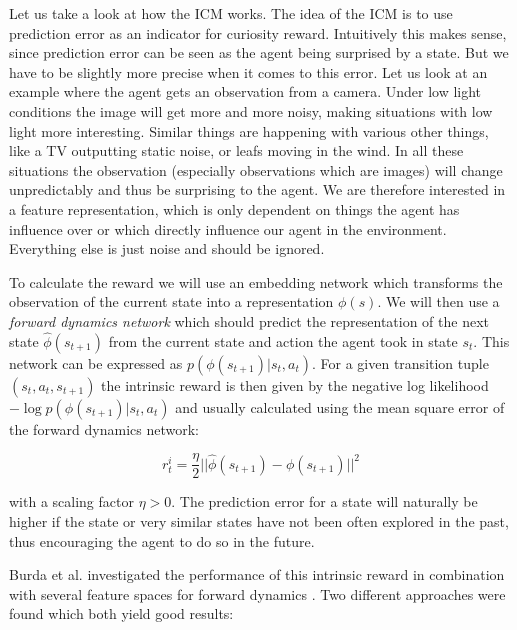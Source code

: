 Let us take a look at how the ICM works. The idea of the ICM is to use prediction error as an indicator for curiosity reward. Intuitively this makes sense, since prediction error can be seen as the agent being surprised by a state. But we have to be slightly more precise when it comes to this error. Let us look at an example where the agent gets an observation from a camera. Under low light conditions the image will get more and more noisy, making situations with low light more interesting. Similar things are happening with various other things, like a TV outputting static noise, or leafs moving in the wind. In all these situations the observation (especially observations which are images) will change unpredictably and thus be surprising to the agent. We are therefore interested in a feature representation, which is only dependent on things the agent has influence over or which directly influence our agent in the environment. Everything else is just noise and should be ignored. 

To calculate the reward we will use an embedding network which transforms the observation of the current state into a representation $\phi(s)$. We will then use a \textit{forward dynamics network} which should predict the representation of the next state $\hat{\phi}(s_{t+1})$ from the current state and action the agent took in state $s_t$. This network can be expressed as $p(\phi(s_{t+1})|s_t, a_t)$. For a given transition tuple $(s_t, a_t, s_{t+1})$ the intrinsic reward is then given by the negative log likelihood $-\log p(\phi(s_{t+1})|s_t, a_t)$ and usually calculated using the mean square error of the forward dynamics network:

\[r^i_t = \frac{\eta}{2}||\hat{\phi}(s_{t+1}) - \phi(s_{t+1})||^2\]

with a scaling factor $\eta > 0$. The prediction error for a state will naturally be higher if the state or very similar states have not been often explored in the past, thus encouraging the agent to do so in the future.

Burda et al. investigated the performance of this intrinsic reward in combination with several feature spaces for forward dynamics \cite{burda2018large}. Two different approaches were found which both yield good results: 

